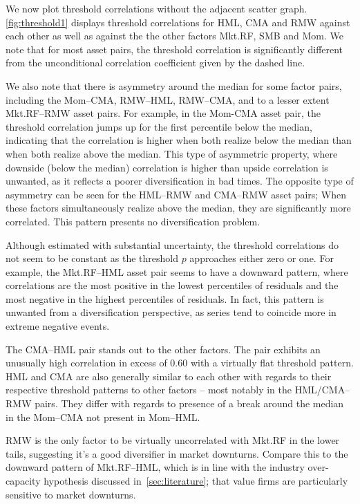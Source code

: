 We now plot threshold correlations without the adjacent scatter graph. \autoref{fig:threshold1} displays threshold correlations for HML, CMA and RMW against each other as well as against the the other factors Mkt.RF, SMB and Mom. We note that for most asset pairs, the threshold correlation is significantly different from the unconditional correlation coefficient given by the dashed line.

We also note that there is asymmetry around the median for some factor pairs, including the Mom--CMA, RMW--HML, RMW--CMA, and to a lesser extent Mkt.RF--RMW asset pairs. For example, in the Mom-CMA asset pair, the threshold correlation jumps up for the first percentile below the median, indicating that the correlation is higher when both realize below the median than when both realize above the median. This type of asymmetric property, where downside (below the median) correlation is higher than upside correlation is unwanted, as it reflects a poorer diversification in bad times. The opposite type of asymmetry can be seen for the HML--RMW and CMA--RMW asset pairs; When these factors simultaneously realize above the median, they are significantly more correlated. This pattern presents no diversification problem.

Although estimated with substantial uncertainty, the threshold correlations do not seem to be constant as the threshold $p$ approaches either zero or one. For example, the Mkt.RF--HML asset pair seems to have a downward pattern, where correlations are the most positive in the lowest percentiles of residuals and the most negative in the highest percentiles of residuals. In fact, this pattern is unwanted from a diversification perspective, as series tend to coincide more in extreme negative events. 

The CMA--HML pair stands out to the other factors. The pair exhibits an unusually high correlation in excess of $0.60$ with a virtually flat threshold pattern. HML and CMA are also generally similar to each other with regards to their respective threshold patterns to other factors -- most notably in the HML/CMA--RMW pairs. They differ with regards to presence of a break around the median in the Mom--CMA not present in Mom--HML.

RMW is the only factor to be virtually uncorrelated with Mkt.RF in the lower tails, suggesting it's a good diversifier in market downturns. Compare this to the downward pattern of Mkt.RF--HML, which is in line with the industry over-capacity hypothesis discussed in~\autoref{sec:literature}; that value firms are particularly sensitive to market downturns.


